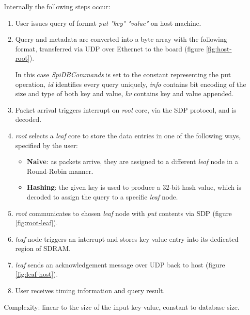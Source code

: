Internally the following steps occur:
\begin{enumerate}
\item User issues query of format \textit{put "key" "value"} on host machine.
\item Query and metadata are converted into a byte array with the following format, transferred via UDP over Ethernet to the board (figure \ref{fig:host-root}).

In this case \textit{SpiDBCommands} is set to the constant representing the put operation, \textit{id} identifies every query uniquely, \textit{info} contains bit encoding of the size and type of both key and value, \textit{k\textunderscore v} contains key and value appended.
\item Packet arrival triggers interrupt on \textit{root} core, via the SDP protocol, and is decoded.
\item \textit{root} selects a \textit{leaf} core to store the data entries in one of the following ways, specified by the user:
\begin{itemize}
	\item \textbf{Naive}: as packets arrive, they are assigned to a different \textit{leaf} node in a Round-Robin manner.
	\item \textbf{Hashing}: the given key is used to produce a 32-bit hash value, which is decoded to assign the query to a specific \textit{leaf} node.
\end{itemize}
\item \textit{root} communicates to chosen \textit{leaf} node with \textit{put} contents via SDP (figure \ref{fig:root-leaf}).
\item \textit{leaf} node triggers an interrupt and stores key-value entry into its dedicated region of SDRAM.
\item \textit{leaf} sends an acknowledgement message over UDP back to host (figure \ref{fig:leaf-host}).
\item User receives timing information and query result.
\end{enumerate}

Complexity: linear to the size of the input key-value, constant to database size.

